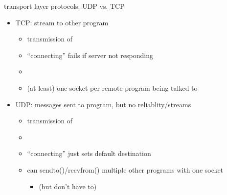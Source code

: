 \begin{frame}[fragile]{transport layer protocols: UDP vs. TCP}
    \begin{itemize}
    \item TCP: stream to other program
        \begin{itemize}
        \item {} transmission of 
        \item ``connecting'' fails if server not responding
        \item {}
        \item (at least) one socket per remote program being talked to
        \end{itemize}
    \item UDP: messages sent to program, but no reliablity/streams
        \begin{itemize}
        \item {} transmission of 
        \item {}
        \item ``connecting'' just sets default destination
        \item can sendto()/recvfrom() multiple other programs with one socket
            \begin{itemize}
                \item (but don't have to)
            \end{itemize}
        \end{itemize}
    \end{itemize}
\end{frame}
